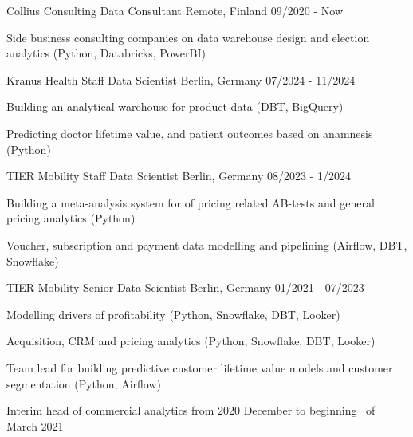 
\begin{cventries}


  \cventry
    {Collius Consulting} %
    {Data Consultant} %
    {Remote, Finland} %
    {09/2020 - Now} %
    {
      \begin{cvitems}
        \item {Side business consulting companies on data warehouse design and election analytics (Python, Databricks, PowerBI)}
      \end{cvitems}
    }

  \cventry
    {Kranus Health} %
    {Staff Data Scientist} %
    {Berlin, Germany} %
    {07/2024 - 11/2024} %
    {
      \begin{cvitems}
        \item {Building an analytical warehouse for product data (DBT, BigQuery)}
        \item {Predicting doctor lifetime value, and patient outcomes based on anamnesis (Python)}
      \end{cvitems}
    }

  \cventry
    {TIER Mobility} %
    {Staff Data Scientist} %
    {Berlin, Germany} %
    {08/2023 - 1/2024} %
    {
      \begin{cvitems}
        \item {Building a meta-analysis system for of pricing related AB-tests and general pricing analytics (Python)}
        \item {Voucher, subscription and payment data modelling and pipelining (Airflow, DBT, Snowflake)}
      \end{cvitems}
    }

  \cventry
    {TIER Mobility} %
    {Senior Data Scientist} %
    {Berlin, Germany} %
    {01/2021 - 07/2023} %
    {
      \begin{cvitems}
        \item {Modelling drivers of profitability (Python, Snowflake, DBT, Looker)}
        \item {Acquisition, CRM and pricing analytics (Python, Snowflake, DBT, Looker)}
        \item {Team lead for building predictive customer lifetime
        value models and customer segmentation (Python, Airflow)}
        \item {Interim head of commercial analytics from 2020 December to beginning \
        of March 2021}
      \end{cvitems}
    }


\end{cventries}
